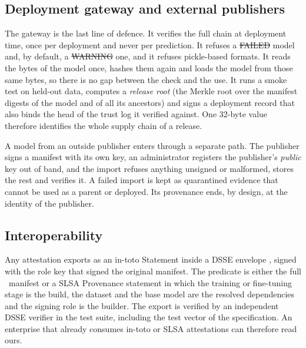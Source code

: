 \subsection{Deployment gateway and external publishers}
The gateway is the last line of defence. It verifies the full chain at deployment time, once per deployment and
never per prediction. It refuses a \st{FAILED} model and, by default, a \st{WARNING} one, and it refuses
pickle-based formats. It reads the bytes of the model once, hashes them again and loads the model from those
same bytes, so there is no gap between the check and the use. It runs a smoke test on held-out data, computes a
\emph{release root} (the Merkle root over the manifest digests of the model and of all its ancestors) and signs
a deployment record that also binds the head of the trust log it verified against. One 32-byte value therefore
identifies the whole supply chain of a release.

A model from an outside publisher enters through a separate path. The publisher signs a manifest with its own
key, an administrator registers the publisher's \emph{public} key out of band, and the import refuses anything
unsigned or malformed, stores the rest and verifies it. A failed import is kept as quarantined evidence that
cannot be used as a parent or deployed. Its provenance ends, by design, at the identity of the publisher.

\subsection{Interoperability}
Any attestation exports as an in-toto Statement inside a DSSE envelope \cite{intotoattest,dsse}, signed with the
role key that signed the original manifest. The predicate is either the full \sys\ manifest or a SLSA
Provenance statement \cite{slsa11} in which the training or fine-tuning stage is the build, the dataset and the
base model are the resolved dependencies and the signing role is the builder. The export is verified by an
independent DSSE verifier in the test suite, including the test vector of the specification. An enterprise that
already consumes in-toto or SLSA attestations can therefore read ours.

